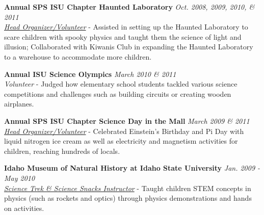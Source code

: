 \documentclass[11pt, letterpaper, roman]{moderncv} %
\newcommand{\outreachspace}{\vspace{5pt}}
\begin{document}
\outreachspace
\textbf{Annual SPS ISU Chapter Haunted Laboratory} \hfill \textit{Oct. 2008, 2009, 2010, \& 2011}\\
\textit{\href{http://www.isu.edu/headlines/?p=3408}{Head Organizer/Volunteer}} - Assisted in setting up the Haunted Laboratory to scare children with spooky physics and taught them the science of light and illusion; Collaborated with Kiwanis Club in expanding the Haunted Laboratory to a warehouse to accommodate more children.

\outreachspace
\textbf{Annual ISU Science Olympics} \hfill \textit{March 2010 \& 2011}\\
\textit{Volunteer} - Judged how elementary school students tackled various science competitions and challenges such as building circuits or creating wooden airplanes.

\outreachspace
\textbf{Annual SPS ISU Chapter Science Day in the Mall} \hfill \textit{March 2009 \& 2011}\\
\textit{\href{http://m.idahostatejournal.com/news/local/idaho-state-university-physics-club-receives-national-award/article_1823c468-8600-11e2-94b3-0019bb2963f4.html?mode=image&photo=0}{Head Organizer/Volunteer}} - Celebrated Einstein's Birthday and Pi Day with liquid nitrogen ice cream as well as electricity and magnetism activities for children, reaching hundreds of locals.

\outreachspace
\textbf{Idaho Museum of Natural History at Idaho State University} \hfill \textit{Jan. 2009 - May 2010}\\
\textit{\href{http://imnh.isu.edu/home/index.php/science-trek/}{Science Trek \& Science Snacks Instructor}} - Taught children STEM concepts in physics (such as rockets and optics) through physics demonstrations and hands on activities.





\end{document}
